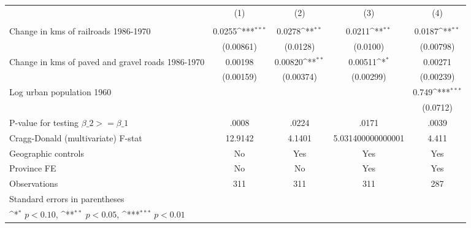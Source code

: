 {
\def\sym#1{\ifmmode^{#1}\else\(^{#1}\)\fi}
\begin{tabular}{l*{4}{c}}
\hline\hline
                &\multicolumn{1}{c}{(1)}&\multicolumn{1}{c}{(2)}&\multicolumn{1}{c}{(3)}&\multicolumn{1}{c}{(4)}\\
                &\multicolumn{1}{c}{}&\multicolumn{1}{c}{}&\multicolumn{1}{c}{}&\multicolumn{1}{c}{}\\
\hline
Change in kms of railroads 1986-1970&   0.0255\sym{***}&   0.0278\sym{**} &   0.0211\sym{**} &   0.0187\sym{**} \\
                &(0.00861)         & (0.0128)         & (0.0100)         &(0.00798)         \\
[1em]
Change in kms of paved and gravel roads 1986-1970&  0.00198         &  0.00820\sym{**} &  0.00511\sym{*}  &  0.00271         \\
                &(0.00159)         &(0.00374)         &(0.00299)         &(0.00239)         \\
[1em]
Log urban population 1960&                  &                  &                  &    0.749\sym{***}\\
                &                  &                  &                  & (0.0712)         \\
\hline
P-value for testing $\beta\_{2} >= \beta\_{1}$&    .0008         &    .0224         &    .0171         &    .0039         \\
Cragg-Donald (multivariate) F-stat&  12.9142         &   4.1401         &5.031400000000001         &    4.411         \\
Geographic controls&       No         &      Yes         &      Yes         &      Yes         \\
Province FE     &       No         &       No         &      Yes         &      Yes         \\
Observations    &      311         &      311         &      311         &      287         \\
\hline\hline
\multicolumn{5}{l}{\footnotesize Standard errors in parentheses}\\
\multicolumn{5}{l}{\footnotesize \sym{*} \(p<0.10\), \sym{**} \(p<0.05\), \sym{***} \(p<0.01\)}\\
\end{tabular}
}
